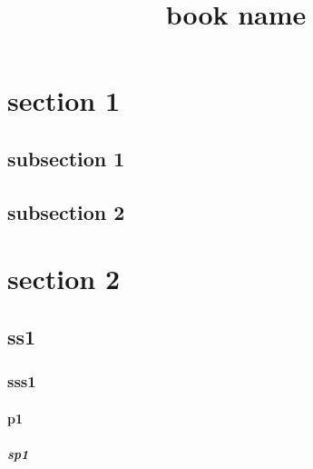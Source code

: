 \documentclass{book}
\begin{document}
\title{book name}
\maketitle

\tableofcontents
\setcounter{tocdepth}{5}
\pagebreak

\setcounter{secnumdepth}{5}

\blindtext

\section{section 1}
\subsection{subsection 1}
\Blindtext
\newpage
\subsection{subsection 2}
\Blindtext

\section[s2]{section 2}
\blindtext
\subsection{ss1}
\blindtext
\subsubsection{sss1}
\blindtext
\paragraph{p1}
\blindtext
\subparagraph{sp1}
\blindtext
\end{document}

